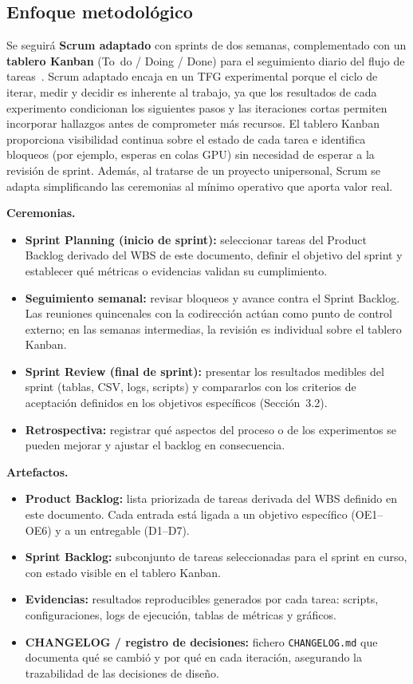 \documentclass[11pt,a4paper]{article}
\begin{document}
\subsection{Enfoque metodológico}

Se seguirá \textbf{Scrum adaptado} con sprints de dos semanas, complementado con un \textbf{tablero Kanban} (To~do / Doing / Done) para el seguimiento diario del flujo de tareas~\cite{schwaber2020scrum}. Scrum adaptado encaja en un TFG experimental porque el ciclo de iterar, medir y decidir es inherente al trabajo, ya que los resultados de cada experimento condicionan los siguientes pasos y las iteraciones cortas permiten incorporar hallazgos antes de comprometer más recursos. El tablero Kanban proporciona visibilidad continua sobre el estado de cada tarea e identifica bloqueos (por ejemplo, esperas en colas GPU) sin necesidad de esperar a la revisión de sprint. Además, al tratarse de un proyecto unipersonal, Scrum se adapta simplificando las ceremonias al mínimo operativo que aporta valor real.

\textbf{Ceremonias.}
\begin{itemize}[nosep,leftmargin=*]
\item \textbf{Sprint Planning (inicio de sprint):} seleccionar tareas del Product Backlog derivado del WBS de este documento, definir el objetivo del sprint y establecer qué métricas o evidencias validan su cumplimiento.
\item \textbf{Seguimiento semanal:} revisar bloqueos y avance contra el Sprint Backlog. Las reuniones quincenales con la codirección actúan como punto de control externo; en las semanas intermedias, la revisión es individual sobre el tablero Kanban.
\item \textbf{Sprint Review (final de sprint):} presentar los resultados medibles del sprint (tablas, CSV, logs, scripts) y compararlos con los criterios de aceptación definidos en los objetivos específicos (Sección~3.2).
\item \textbf{Retrospectiva:} registrar qué aspectos del proceso o de los experimentos se pueden mejorar y ajustar el backlog en consecuencia.
\end{itemize}

\textbf{Artefactos.}
\begin{itemize}[nosep,leftmargin=*]
\item \textbf{Product Backlog:} lista priorizada de tareas derivada del WBS definido en este documento. Cada entrada está ligada a un objetivo específico (OE1--OE6) y a un entregable (D1--D7).
\item \textbf{Sprint Backlog:} subconjunto de tareas seleccionadas para el sprint en curso, con estado visible en el tablero Kanban.
\item \textbf{Evidencias:} resultados reproducibles generados por cada tarea: scripts, configuraciones, logs de ejecución, tablas de métricas y gráficos.
\item \textbf{CHANGELOG / registro de decisiones:} fichero \texttt{CHANGELOG.md} que documenta qué se cambió y por qué en cada iteración, asegurando la trazabilidad de las decisiones de diseño.
\end{itemize}
\end{document}
